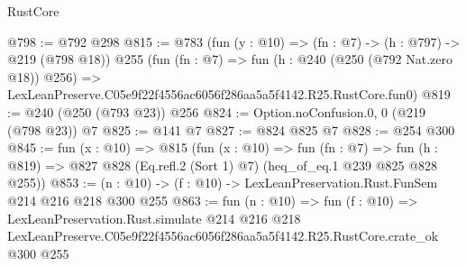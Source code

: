 \begin{lexlean}{RustCore}
\begin{coremodule}
@798 := @792 @298
@815 := @783
    (fun (y : @10) => (fn : @7) -> (h : @797) -> @219 (@798 @18))
    @255
    (fun (fn : @7) =>
    fun (h : @240 (@250 (@792 Nat.zero @18)) @256) =>
    LexLeanPreserve.C05e9f22f4556ac6056f286aa5a5f4142.R25.RustCore.fun0)
@819 := @240 (@250 (@793 @23)) @256
@824 := Option.noConfusion.{0, 0} (@219 (@798 @23)) @7
@825 := @141 @7
@827 := @824 @825 @7
@828 := @254 @300
@845 := fun (x : @10) =>
  @815
    (fun (x : @10) =>
    fun (fn : @7) =>
    fun (h : @819) => @827 @828 (Eq.refl.{2} (Sort 1) @7) (heq_of_eq.{1} @239 @825 @828 @255))
@853 := (n : @10) -> (f : @10) -> LexLeanPreservation.Rust.FunSem @214 @216 @218 @300 @255
@863 := fun (n : @10) =>
  fun (f : @10) =>
  LexLeanPreservation.Rust.simulate
    @214
    @216
    @218
    LexLeanPreserve.C05e9f22f4556ac6056f286aa5a5f4142.R25.RustCore.crate_ok
    @300
    @255
\end{coremodule}
\end{lexlean}
